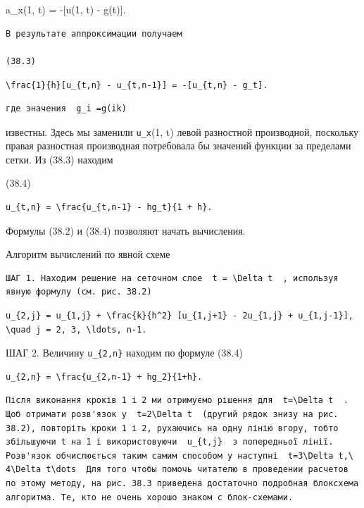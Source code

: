 \documentclass[
  ukrainian,
]{article}
\begin{document}
a\_x(1, t) = -{[}u(1, t) - g(t){]}.

\begin{verbatim}
В результате аппроксимации получаем

(38.3)
\end{verbatim}

\texttt{\textbackslash{}frac\{1\}\{h\}{[}u\_\{t,n\}\ -\ u\_\{t,n-1\}{]}\ =\ -{[}u\_\{t,n\}\ -\ g\_t{]}.}

\begin{verbatim}
где значения  g_i =g(ik)
\end{verbatim}

известны. Здесь мы заменили \texttt{u\_x}(1, t) левой разностной
производной, поскольку правая разностная производная потребовала бы
значений функции за пределами сетки. Из (38.3) находим

(38.4)

\begin{verbatim}
u_{t,n} = \frac{u_{t,n-1} - hg_t}{1 + h}.
\end{verbatim}

Формулы (38.2) и (38.4) позволяют начать вычисления.

Алгоритм вычислений по явной схеме

\begin{verbatim}
ШАГ 1. Находим решение на сеточном слое  t = \Delta t  , используя явную формулу (см. рис. 38.2)
\end{verbatim}

\begin{verbatim}
u_{2,j} = u_{1,j} + \frac{k}{h^2} [u_{1,j+1} - 2u_{1,j} + u_{1,j-1}], \quad j = 2, 3, \ldots, n-1.
\end{verbatim}

ШАГ 2. Величину \texttt{u\_\{2,n\}} находим по формуле (38.4)

\begin{verbatim}
u_{2,n} = \frac{u_{2,n-1} + hg_2}{1+h}.
\end{verbatim}

\begin{verbatim}
Після виконання кроків 1 і 2 ми отримуємо рішення для  t=\Delta t  . Щоб отримати розв'язок у  t=2\Delta t  (другий рядок знизу на рис. 38.2), повторіть кроки 1 і 2, рухаючись на одну лінію вгору, тобто збільшуючи t на 1 і використовуючи  u_{t,j}  з попередньої лінії. Розв'язок обчислюється таким самим способом у наступні  t=3\Delta t,\ 4\Delta t\dots  Для того чтобы помочь читателю в проведении расчетов по этому методу, на рис. 38.3 приведена достаточно подробная блоксхема алгоритма. Те, кто не очень хорошо знаком с блок-схемами.
\end{verbatim}
\end{document}
